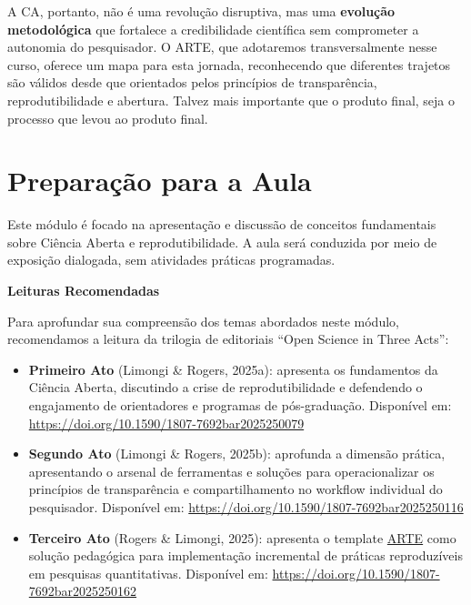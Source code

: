\documentclass[
  a4paper,
]{book}
\begin{document}
A CA, portanto, não é uma revolução disruptiva, mas uma \textbf{evolução
metodológica} que fortalece a credibilidade científica sem comprometer a
autonomia do pesquisador. O ARTE, que adotaremos transversalmente nesse
curso, oferece um mapa para esta jornada, reconhecendo que diferentes
trajetos são válidos desde que orientados pelos princípios de
transparência, reprodutibilidade e abertura. Talvez mais importante que
o produto final, seja o processo que levou ao produto final.

\section{Preparação para a Aula}\label{preparauxe7uxe3o-para-a-aula}

\begin{tcolorbox}[enhanced jigsaw, colback=white, toptitle=1mm, opacityback=0, left=2mm, rightrule=.15mm, title=\textcolor{quarto-callout-important-color}{\faExclamation}\hspace{0.5em}{Pré-requisitos}, coltitle=black, opacitybacktitle=0.6, breakable, toprule=.15mm, bottomtitle=1mm, titlerule=0mm, bottomrule=.15mm, arc=.35mm, leftrule=.75mm, colframe=quarto-callout-important-color-frame, colbacktitle=quarto-callout-important-color!10!white]

Este módulo é focado na apresentação e discussão de conceitos
fundamentais sobre Ciência Aberta e reprodutibilidade. A aula será
conduzida por meio de exposição dialogada, sem atividades práticas
programadas.

\textbf{Leituras Recomendadas}

Para aprofundar sua compreensão dos temas abordados neste módulo,
recomendamos a leitura da trilogia de editoriais ``Open Science in Three
Acts'':

\begin{itemize}
\item
  \textbf{Primeiro Ato} (Limongi \& Rogers, 2025a): apresenta os
  fundamentos da Ciência Aberta, discutindo a crise de reprodutibilidade
  e defendendo o engajamento de orientadores e programas de
  pós-graduação. Disponível em:
  \url{https://doi.org/10.1590/1807-7692bar2025250079}
\item
  \textbf{Segundo Ato} (Limongi \& Rogers, 2025b): aprofunda a dimensão
  prática, apresentando o arsenal de ferramentas e soluções para
  operacionalizar os princípios de transparência e compartilhamento no
  workflow individual do pesquisador. Disponível em:
  \url{https://doi.org/10.1590/1807-7692bar2025250116}
\item
  \textbf{Terceiro Ato} (Rogers \& Limongi, 2025): apresenta o template
  \href{https://phdpablo.github.io/article-template/}{ARTE} como solução
  pedagógica para implementação incremental de práticas reproduzíveis em
  pesquisas quantitativas. Disponível em:
  \url{https://doi.org/10.1590/1807-7692bar2025250162}
\end{itemize}


\end{tcolorbox}
\end{document}
